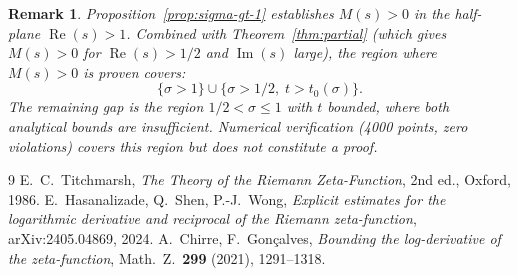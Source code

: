 \documentclass[11pt,a4paper]{article}
\newtheorem{remark}{Remark}
\DeclareMathOperator{\re}{Re}
\DeclareMathOperator{\im}{Im}
\begin{document}
\begin{remark}
Proposition~\ref{prop:sigma-gt-1} establishes $M(s) > 0$ in
the half-plane $\re(s) > 1$. Combined with
Theorem~\ref{thm:partial} (which gives $M(s) > 0$ for
$\re(s) > 1/2$ and $\im(s)$ large), the region where
$M(s) > 0$ is \emph{proven} covers:
\[
  \{\sigma > 1\} \cup \{\sigma > 1/2,\; t > t_0(\sigma)\}.
\]
The remaining gap is the region $1/2 < \sigma \leq 1$ with
$t$ bounded, where both analytical bounds are insufficient.
Numerical verification (4000 points, zero violations) covers
this region but does not constitute a proof.
\end{remark}

\begin{thebibliography}{9}
 E.~C.\ Titchmarsh, \emph{The Theory of the
  Riemann Zeta-Function}, 2nd ed., Oxford, 1986.
 E.\ Hasanalizade, Q.\ Shen, P.-J.\ Wong,
  \emph{Explicit estimates for the logarithmic derivative and
  reciprocal of the Riemann zeta-function}, arXiv:2405.04869, 2024.
 A.\ Chirre, F.\ Gon\c{c}alves, \emph{Bounding
  the log-derivative of the zeta-function}, Math.\ Z.\ \textbf{299}
  (2021), 1291--1318.
\end{thebibliography}
\end{document}
